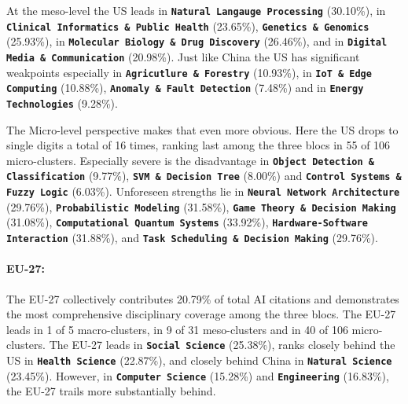 \documentclass{article}
\begin{document}
	At the meso-level the US leads in \textbf{\texttt{Natural Langauge Processing}}  (30.10\%), in \textbf{\texttt{Clinical Informatics \& Public Health}}  (23.65\%), \textbf{\texttt{Genetics \& Genomics}}  (25.93\%), in \textbf{\texttt{Molecular Biology \& Drug Discovery}}  (26.46\%), and in \textbf{\texttt{Digital Media \& Communication}}  (20.98\%). Just like China the US has significant weakpoints especially in \textbf{\texttt{Agricutlure \& Forestry}}  (10.93\%), in \textbf{\texttt{IoT \& Edge Computing}}  (10.88\%), \textbf{\texttt{Anomaly \& Fault Detection}}  (7.48\%) and in \textbf{\texttt{Energy Technologies}}  (9.28\%). 
	
	The Micro-level perspective makes that even more obvious. Here the US drops to single digits a total of 16 times, ranking last among the three blocs in 55 of 106 micro-clusters. Especially severe is the disadvantage in \textbf{\texttt{Object Detection \& Classification}}  (9.77\%), \textbf{\texttt{SVM \& Decision Tree}}  (8.00\%) and \textbf{\texttt{Control Systems \& Fuzzy Logic}}  (6.03\%). Unforeseen strengths lie in \textbf{\texttt{Neural Network Architecture}}  (29.76\%), \textbf{\texttt{Probabilistic Modeling}}  (31.58\%), \textbf{\texttt{Game Theory \& Decision Making}}  (31.08\%), \textbf{\texttt{Computational Quantum Systems}}  (33.92\%), \textbf{\texttt{Hardware-Software Interaction}}  (31.88\%), and \textbf{\texttt{Task Scheduling \& Decision Making}}  (29.76\%).
	
	\paragraph{EU-27:} The EU-27 collectively contributes 20.79\% of total AI citations and demonstrates the most comprehensive disciplinary coverage among the three blocs. The EU-27 leads in 1 of 5 macro-clusters, in 9 of 31 meso-clusters and in 40 of 106 micro-clusters. The EU-27 leads in \textbf{\texttt{Social Science}}  (25.38\%), ranks closely behind the US in \textbf{\texttt{Health Science}}  (22.87\%), and closely behind China in \textbf{\texttt{Natural Science}}  (23.45\%). However, in \textbf{\texttt{Computer Science}}  (15.28\%) and \textbf{\texttt{Engineering}}  (16.83\%), the EU-27 trails more substantially behind. 
	
\end{document}
